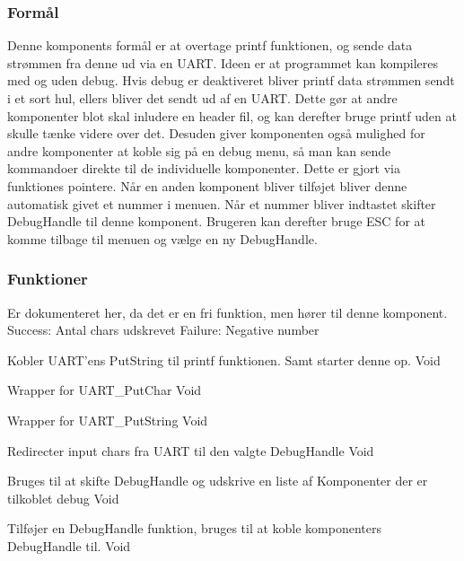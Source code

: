\subsubsection{Formål}
Denne komponents formål er at overtage 
printf funktionen, og sende data strømmen fra denne ud 
via en UART. Ideen er at programmet kan kompileres med 
og uden debug. Hvis debug er deaktiveret bliver printf 
data strømmen sendt i et sort hul, ellers bliver det 
sendt ud af en UART. Dette gør at andre komponenter 
blot skal inludere en header fil, og kan derefter bruge 
printf uden at skulle tænke videre over det. Desuden giver 
komponenten også mulighed for andre komponenter at koble 
sig på en debug menu, så man kan sende kommandoer direkte 
til de individuelle komponenter. Dette er gjort via 
funktiones pointere. Når en anden komponent bliver tilføjet 
bliver denne automatisk givet et nummer i menuen. Når et 
nummer bliver indtastet skifter DebugHandle til denne 
komponent. Brugeren kan derefter bruge ESC for at komme 
tilbage til menuen og vælge en ny DebugHandle.


\subsubsection{Funktioner}

{Er dokumenteret her, da det er en fri funktion, men hører til denne komponent.}
{Success: Antal chars udskrevet Failure: Negative number}
{
}

{Kobler UART'ens PutString til printf funktionen. Samt starter denne op.}
{Void}
{}

{Wrapper for UART\_PutChar}
{Void}
{
}

{Wrapper for UART\_PutString}
{Void}
{
}

{Redirecter input chars fra UART til den valgte DebugHandle}
{Void}
{}

{Bruges til at skifte DebugHandle og udskrive en liste af Komponenter der er tilkoblet debug}
{Void}
{}

{Tilføjer en DebugHandle funktion, bruges til at koble komponenters DebugHandle til.}
{Void}
{}
